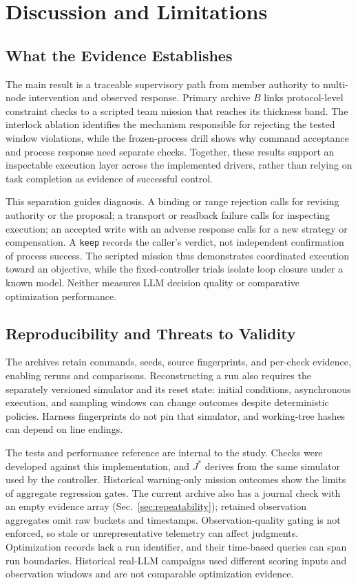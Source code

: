 \section{Discussion and Limitations}
\label{sec:limits}
\subsection{What the Evidence Establishes}
The main result is a traceable supervisory path from member authority to
multi-node intervention and observed response. Primary archive $B$ links
protocol-level constraint checks to a scripted team mission that reaches its
thickness band. The interlock ablation identifies the mechanism responsible
for rejecting the tested window violations, while the frozen-process drill
shows why command acceptance and process response need separate checks.
Together, these results support an inspectable execution layer across the
implemented drivers, rather than relying on task completion as evidence of
successful control.

This separation guides diagnosis. A binding or range rejection calls for
revising authority or the proposal; a transport or readback failure calls for
inspecting execution; an accepted write with an adverse response calls for a
new strategy or compensation. A \texttt{keep} records the caller's verdict,
not independent confirmation of process success. The scripted mission thus
demonstrates coordinated execution toward an objective, while the
fixed-controller trials isolate loop closure under a known model. Neither
measures LLM decision quality or comparative optimization performance.

\subsection{Reproducibility and Threats to Validity}
\label{sec:repro}
The archives retain commands, seeds, source fingerprints, and per-check
evidence, enabling reruns and comparisons. Reconstructing a run also requires
the separately versioned simulator and its reset state: initial conditions,
asynchronous execution, and sampling windows can change outcomes despite
deterministic policies. Harness fingerprints do not pin that simulator, and
working-tree hashes can depend on line endings.

The tests and performance reference are internal to the study. Checks were
developed against this implementation, and $J^{*}$ derives from the same
simulator used by the controller. Historical warning-only mission outcomes
show the limits of aggregate regression gates. The current archive also has a
journal check with an empty evidence array
(Sec.~\ref{sec:repeatability}); retained observation aggregates omit raw
buckets and timestamps. Observation-quality gating is not enforced, so stale
or unrepresentative telemetry can affect judgments. Optimization records lack
a run identifier, and their time-based queries can span run boundaries.
Historical real-LLM campaigns used different scoring inputs and observation
windows and are not comparable optimization evidence.

